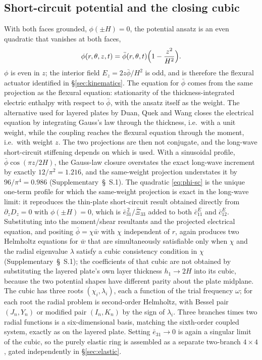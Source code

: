 \documentclass[11pt]{article}
\newcommand{\eebar}{\bar{e}_{31}}
\newcommand{\Xibar}{\bar{\Xi}_{33}}
\newcommand{\cbar}{\bar{c}_{11}^{E}}
\begin{document}
\subsection{Short-circuit potential and the closing cubic}
\label{sec:sc}
With both faces grounded, $\phi(\pm H)=0$, the potential ansatz is an
even quadratic that vanishes at both faces,
\begin{equation}
\phi(r,\theta,z,t)=\bar\phi(r,\theta,t)\Bigl(1-\frac{z^2}{H^2}\Bigr).
\label{eq:phi-sc}
\end{equation}
$\phi$ is even in $z$; the interior field $E_z=2z\bar\phi/H^2$ is odd,
and is therefore the flexural actuator identified in
\S\ref{sec:kinematics}. The equation for $\bar\phi$ comes from the same
projection as the flexural equation: stationarity of the
thickness-integrated electric enthalpy with respect to $\bar\phi$, with
the ansatz itself as the weight. The alternative used for layered plates
by Duan, Quek and Wang \cite{duan2005} closes the electrical equation by
integrating Gauss's law through the thickness, i.e.\ with a unit weight,
while the coupling reaches the flexural equation through the moment,
i.e.\ with weight $z$. The two projections are then not conjugate, and
the long-wave short-circuit stiffening depends on which is used. With a
sinusoidal profile, $\bar\phi\cos(\pi z/2H)$, the Gauss-law closure
overstates the exact long-wave increment by exactly $12/\pi^2=1.216$,
and the same-weight projection understates it by $96/\pi^4=0.986$
(Supplementary~\S~S.1). The quadratic \eqref{eq:phi-sc} is the unique
one-term profile for which the same-weight projection is exact in the
long-wave limit: it reproduces the thin-plate short-circuit result
obtained directly from $\partial_zD_z=0$ with $\phi(\pm H)=0$, which is
$\eebar^{\,2}/\Xibar$ added to both $\cbar$ and $\bar c_{12}^E$.
Substituting into the moment/shear resultants and the projected
electrical equation, and positing
$\bar\phi=\chi\bar w$ with $\chi$ independent of $r$, again produces two
Helmholtz equations for $\bar w$ that are simultaneously satisfiable only
when $\chi$ and the radial eigenvalue $\lambda$ satisfy a cubic
consistency condition in $\chi$ (Supplementary~\S~S.1); the coefficients
of that cubic are not obtained by substituting the layered plate's own
layer thickness $h_1\to2H$ into its cubic, because the two potential
shapes have different parity about the plate midplane. The cubic has
three roots $(\chi_i,\lambda_i)$, each a function of the trial frequency
$\omega$; for each root the radial problem is second-order Helmholtz,
with Bessel pair $(J_n,Y_n)$ or modified pair $(I_n,K_n)$ by the sign of
$\lambda_i$. Three branches times two radial functions is a
six-dimensional basis, matching the sixth-order coupled system, exactly
as on the layered plate. Setting $\eebar\to0$ is again a singular limit
of the cubic, so the purely elastic ring is assembled as a separate
two-branch $4\times4$, gated independently in \S\ref{sec:elastic}.
\end{document}

